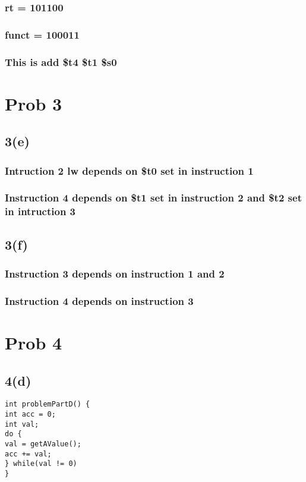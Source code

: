 \documentclass[11pt]{article}
\begin{document}
\subsubsection{rt = 101100}
\label{sec:orgb1ea2fb}
\subsubsection{funct = 100011}
\label{sec:org8606b8c}
\subsubsection{This is add \$t4 \$t1 \$s0}
\label{sec:org11d270c}
\section{Prob 3}
\label{sec:org1178378}
\subsection{3(e)}
\label{sec:orgd81a800}
\subsubsection{Intruction 2 lw depends on \$t0 set in instruction 1}
\label{sec:org11cc0bd}
\subsubsection{Instruction 4 depends on \$t1 set in instruction 2 and \$t2 set in intruction 3}
\label{sec:org6609252}
\subsection{3(f)}
\label{sec:org9904d87}
\subsubsection{Instruction 3 depends on instruction 1 and 2}
\label{sec:org4952b0d}
\subsubsection{Instruction 4 depends on instruction 3}
\label{sec:orgb2b2fa3}
\section{Prob 4}
\label{sec:org60e6de0}
\subsection{4(d)}
\label{sec:org4fed999}
\begin{verbatim}
int problemPartD() {
int acc = 0;
int val;
do {
val = getAValue();
acc += val;
} while(val != 0)
}
\end{verbatim}
\end{document}
